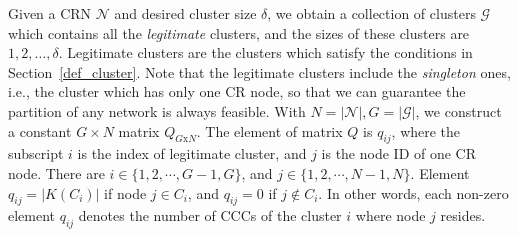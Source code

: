\documentclass[10pt,journal,compsoc]{IEEEtran}
\theoremstyle{mytheoremstyle}
\theoremstyle{mytheoremstyle}
\theoremstyle{mytheoremstyle}
\newcommand{\ie}{i.e., }
\newcommand{\bigO}{\ensuremath{\mathcal{O}}}%
\begin{document}





Given a CRN $\mathcal{N}$ and desired cluster size $\delta$, we obtain a collection of clusters $\mathcal{G}$ which contains all the \textit{legitimate} clusters, and the sizes of these clusters are $1,2,\ldots,\delta$.
Legitimate clusters are the clusters which satisfy the conditions in Section~\ref{def_cluster}. 
Note that the legitimate clusters include the \textit{singleton} ones, \ie the cluster which has only one CR node, so that we can guarantee the partition of any network is always feasible.
%
With $N=|\mathcal{N}|, G=|\mathcal{G}|$, we construct a constant $G\times N$ matrix $Q_{G\text{x}N}$. 
The element of matrix $Q$ is $q_{ij}$, where the subscript $i$ is the index of legitimate cluster, and $j$ is the node ID of one CR node.
There are $i\in \{1,2,\cdots,G-1, G\}$, and $j\in \{1,2,\cdots,N-1, N\}$.
Element $q_{ij}= |K(C_i)|$ if node $j\in C_i$, and $q_{ij}= 0$ if $j\notin C_i$.
In other words, each non-zero element $q_{ij}$ denotes the number of CCCs of the cluster $i$ where node $j$ resides.
\end{document}
